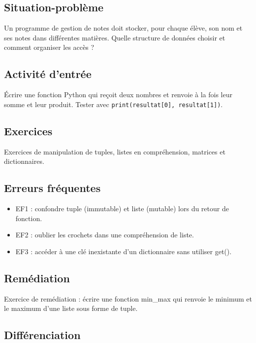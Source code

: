 \subsection{Situation-problème}

Un programme de gestion de notes doit stocker, pour chaque élève, son
nom et ses notes dans différentes matières. Quelle structure de données
choisir et comment organiser les accès ?

\subsection{Activité d’entrée}

Écrire une fonction Python qui reçoit deux nombres et renvoie à la fois
leur somme et leur produit. Tester avec \lstinline|print(resultat[0], resultat[1])|.

\subsection{Exercices}

Exercices de manipulation de tuples, listes en compréhension, matrices
et dictionnaires.

\subsection{Erreurs fréquentes}

\begin{itemize}
\tightlist
\item
  EF1 : confondre tuple (immutable) et liste (mutable) lors du retour de
  fonction.
\item
  EF2 : oublier les crochets dans une compréhension de liste.
\item
  EF3 : accéder à une clé inexistante d'un dictionnaire sans utiliser
  get().
\end{itemize}

\subsection{Remédiation}

Exercice de remédiation : écrire une fonction min\_max qui renvoie le
minimum et le maximum d'une liste sous forme de tuple.

\subsection{Différenciation}

